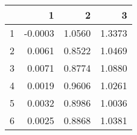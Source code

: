 \begin{table}[ht]
\begin{center}
\begin{tabular}{rrrr}
  \hline
 & 1 & 2 & 3 \\ 
  \hline
1 & -0.0003 & 1.0560 & 1.3373 \\ 
  2 & 0.0061 & 0.8522 & 1.0469 \\ 
  3 & 0.0071 & 0.8774 & 1.0880 \\ 
  4 & 0.0019 & 0.9606 & 1.0261 \\ 
  5 & 0.0032 & 0.8986 & 1.0036 \\ 
  6 & 0.0025 & 0.8868 & 1.0381 \\ 
   \hline
\end{tabular}
\end{center}
\end{table}
